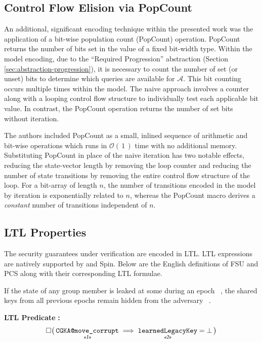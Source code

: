 \documentclass[runningheads]{llncs}
\newcommand{\Abrev}[1]{\gls{#1}}
\newcommand{\Adversary}{\ensuremath{\mathcal{A}}\xspace}
\newcommand{\BigO}[1]{\ensuremath{\mathcal{O}\left(\,#1\,\right)}\xspace}
\begin{document}
\subsection{Control Flow Elision via PopCount\label{sec:popcount}}

An additional, significant \Promela encoding technique within the presented work was the application of a bit-wise population count (PopCount) operation.
PopCount returns the number of bits set in the value of a fixed bit-width type.
Within the model encoding, due to the ``Required Progression''  abstraction (Section \ref{sec:abstraction-progression}), it is necessary to count the number of set (or unset) bits to determine which queries are available for \Adversary.
This bit counting occurs multiple times within the model.
The naive approach involves a counter along with a looping control flow structure to individually test each applicable bit value.
In contrast, the PopCount operation returns the number of set bits without iteration.

The authors included PopCount as a small, inlined sequence of arithmetic and bit-wise operations which runs in \BigO{1} time with no additional memory.
Substituting PopCount in place of the naive iteration has two notable effects, reducing the state-vector length by removing the loop counter and reducing the number of state transitions by removing the entire control flow structure of the loop.
For a bit-array of length $n$, the number of transitions encoded in the model by iteration is exponentially related to $n$, whereas the PopCount macro derives a \emph{constant} number of transitions independent of $n$.

\newcommand{\UnderNote}[1]{%
{\textit{\textsf{\guillemotleft#1\guillemotright}}}%
}
\newcommand{\UnderNoteRef}[1]{%
\,\raisebox{0.15em}{\scalebox{0.65}{\UnderNote{#1}}}%
}

\newcommand{\TermLTL}[1]{{\small{\texttt{#1}}}}


\subsection{LTL Properties}

The security guarantees under verification are encoded in \Abrev{LTL}.
\Abrev{LTL} expressions are natively supported by \Promela and Spin.
Below are the English definitions of \Abrev{FSU} and \Abrev{PCS} along with their corresponding \Abrev{LTL} formulae.

\begin{definition}
If the state of any group member is leaked at some during an epoch\UnderNoteRef{1}, the shared keys from all previous epochs remain hidden from the adversary\UnderNoteRef{2}.
\end{definition}%
\noindent\textbf{LTL Predicate} \textbf{:}%
{\small%
\[%
\Box \big(\, \underset{\UnderNote{1}}{\texttt{CGKA@move\_corrupt}} \implies \underset{\UnderNote{2}}{\texttt{learnedLegacyKey}} = \bot \,\big)%
\]%
}
\end{document}
